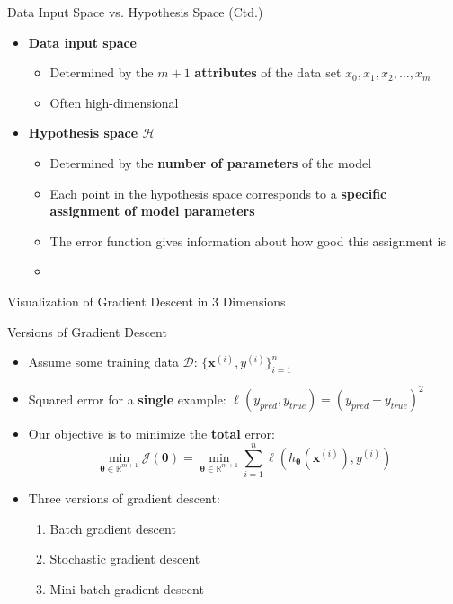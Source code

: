 \begin{frame}{Data Input Space vs. Hypothesis Space (Ctd.)}{}
	\begin{itemize}
		\item \textbf{Data input space}
		\begin{itemize}
			\item Determined by the $m + 1$ \textbf{attributes} of the data set $x_0, x_1, x_2, \dots, x_m$
			\item Often high-dimensional
		\end{itemize}
		\item \textbf{Hypothesis space $\mathcal{H}$}
		\begin{itemize}
			\item Determined by the \textbf{number of parameters} of the model
			\item Each point in the hypothesis space corresponds to a \textbf{specific assignment of model parameters}
			\item The error function gives information about how good this assignment is
			\item {}
		\end{itemize}
	\end{itemize}
\end{frame}


\begin{frame}{Visualization of Gradient Descent in 3 Dimensions}{}
	
\end{frame}


\begin{frame}{Versions of Gradient Descent}{}
	\begin{itemize}
		\item Assume some training data $\mathcal{D}$: $\{ \bm{x}^{(i)}, y^{(i)} \}_{i=1}^{n}$
		\item Squared error for a \textbf{single} example: $\ell(y_{pred}, y_{true}) = (y_{pred} - y_{true})^2$
		\item Our objective is to minimize the \textbf{total} error:
		\begin{equation*}
			\min_{\bm{\theta} \in \mathbb{R}^{m+1}} \mathcal{J}(\bm{\theta}) =
				\min_{\bm{\theta} \in \mathbb{R}^{m+1}} \sum_{i=1}^n \ell(h_{\bm{\theta}}(\bm{x}^{(i)}), y^{(i)})
		\end{equation*}
		\item Three versions of gradient descent:
		\begin{enumerate}
			\item Batch gradient descent
			\item Stochastic gradient descent
			\item Mini-batch gradient descent
		\end{enumerate}
	\end{itemize}
\end{frame}


